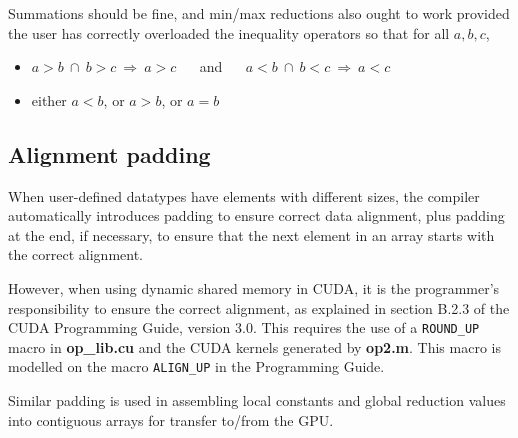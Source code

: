 \documentclass[12pt]{article}
\begin{document}
Summations should be fine, and min/max reductions also ought to work 
provided the user has correctly overloaded the inequality operators 
so that for all $a, b, c$, 
\begin{itemize}
\item\vspace*{-0.1in} $a\!>\!b\ \cap\ b\!>\!c\ \Longrightarrow\ a\!>\!c$ 
           ~~ and ~~   $a\!<\!b\ \cap\ b\!<\!c\ \Longrightarrow\ a\!<\!c$ 
\item\vspace*{-0.1in}  either $a\!<\!b$, or $a\!>\!b$, or $a\!=\!b$
\end{itemize}

%
%

\subsection{Alignment padding}

When user-defined datatypes have elements with different sizes, the 
compiler automatically introduces padding to ensure correct data 
alignment, plus padding at the end, if necessary, to ensure that 
the next element in an array starts with the correct alignment.

However, when using dynamic shared memory in CUDA, it is the 
programmer's responsibility to ensure the correct alignment, as 
explained in section B.2.3 of the CUDA Programming Guide, version 3.0.
This requires the use of a {\tt ROUND\_UP} macro in {\bf op\_lib.cu}
and the CUDA kernels generated by {\bf op2.m}.  This macro is
modelled on the macro {\tt ALIGN\_UP} in the Programming Guide.

Similar padding is used in assembling local constants and global
reduction values into contiguous arrays for transfer to/from the GPU. 
\end{document}
